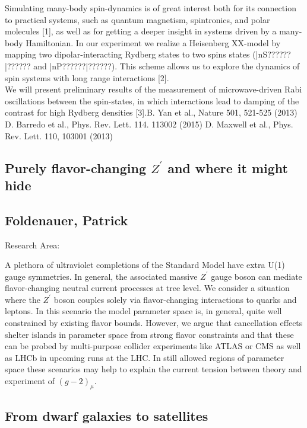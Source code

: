 \noindent Simulating many-body spin-dynamics is of great interest both for its connection to practical systems, such as quantum magnetism, spintronics, and polar molecules [1], as well as for getting a deeper insight in systems driven by a many-body Hamiltonian. In our experiment we realize a Heisenberg XX-model by mapping two dipolar-interacting Rydberg states to two spins states (|nS??????|?????? and |nP??????|??????). This scheme allows us to explore the dynamics of spin systems with long range interactions [2].\\We will present preliminary results of the measurement of microwave-driven Rabi oscillations between the spin-states, in which interactions lead to damping of the contrast for high Rydberg densities [3].\newline [1] B. Yan et al., Nature 501, 521-525 (2013) \newline [2] D. Barredo et al., Phys. Rev. Lett. 114. 113002 (2015) \newline [3] D. Maxwell et al., Phys. Rev. Lett. 110, 103001 (2013)


\newpage
\subsection*{\centering \large Purely flavor-changing $Z^\prime$ and where it might hide}
\subsection*{\centering \normalsize Foldenauer, Patrick}
Research Area: \newline

\noindent A plethora of ultraviolet completions of the Standard Model have extra U(1) gauge symmetries. In general, the associated massive $Z^\prime$ gauge boson can mediate flavor-changing neutral current processes at tree level. We consider a situation where the $Z^\prime$ boson couples solely via flavor-changing interactions to quarks and leptons. In this scenario the model parameter space is, in general, quite well constrained by existing flavor bounds. However, we argue that cancellation effects shelter islands in parameter space from strong flavor constraints and that these can be probed by multi-purpose collider experiments like ATLAS or CMS as well as LHCb in upcoming runs at the LHC. In still allowed regions of parameter space these scenarios may help to explain the current tension between theory and experiment of $(g-2)_\mu$.

\subsection*{\centering \large From dwarf galaxies to satellites}
